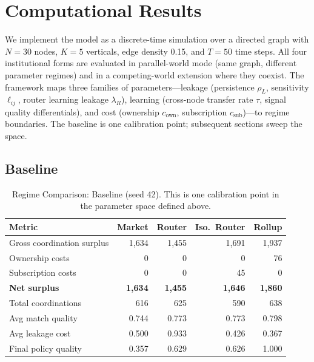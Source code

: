 \documentclass[12pt]{article}
\theoremstyle{definition}
\begin{document}
\section{Computational Results}

We implement the model as a discrete-time simulation over a directed graph with $N = 30$ nodes, $K = 5$ verticals, edge density 0.15, and $T = 50$ time steps. All four institutional forms are evaluated in parallel-world mode (same graph, different parameter regimes) and in a competing-world extension where they coexist. The framework maps three families of parameters---leakage (persistence $\rho_L$, sensitivity $\ell_{ij}$, router learning leakage $\lambda_R$), learning (cross-node transfer rate $\tau$, signal quality differentials), and cost (ownership $c_{\text{own}}$, subscription $c_{\text{sub}}$)---to regime boundaries. The baseline is one calibration point; subsequent sections sweep the space.

\subsection{Baseline}
\label{sec:baseline}

\begin{table}[H]
\centering
\caption{Regime Comparison: Baseline (seed 42). This is one calibration point in the parameter space defined above.}
\label{tab:baseline}
\begin{tabular}{lrrrr}
\toprule
Metric & Market & Router & Iso.\ Router & Rollup \\
\midrule
Gross coordination surplus & 1,634 & 1,455 & 1,691 & 1,937 \\
Ownership costs & 0 & 0 & 0 & 76 \\
Subscription costs & 0 & 0 & 45 & 0 \\
\textbf{Net surplus} & \textbf{1,634} & \textbf{1,455} & \textbf{1,646} & \textbf{1,860} \\
Total coordinations & 616 & 625 & 590 & 638 \\
Avg match quality & 0.744 & 0.773 & 0.773 & 0.798 \\
Avg leakage cost & 0.500 & 0.933 & 0.426 & 0.367 \\
Final policy quality & 0.357 & 0.629 & 0.626 & 1.000 \\
\bottomrule
\end{tabular}
\end{table}
\end{document}
